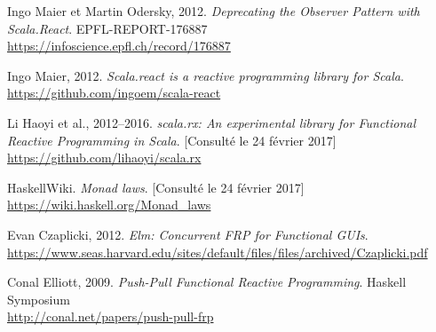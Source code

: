 \begin{thebibliography}{99}

Ingo Maier et Martin Odersky, 2012.
\emph{Deprecating the Observer Pattern with Scala.React}.
EPFL-REPORT-176887\\
\url{https://infoscience.epfl.ch/record/176887}

Ingo Maier, 2012.
\emph{Scala.react is a reactive programming library for Scala}.\\
\url{https://github.com/ingoem/scala-react}

Li Haoyi et al., 2012--2016.
\emph{scala.rx: An experimental library for Functional Reactive Programming in Scala}.
[Consulté le 24 février 2017]\\
\url{https://github.com/lihaoyi/scala.rx}

HaskellWiki.
\emph{Monad laws}.
[Consulté le 24 février 2017]\\
\url{https://wiki.haskell.org/Monad_laws}

Evan Czaplicki, 2012.
\emph{Elm: Concurrent FRP for Functional GUIs}.
\\
\url{https://www.seas.harvard.edu/sites/default/files/files/archived/Czaplicki.pdf}

Conal Elliott, 2009.
\emph{Push-Pull Functional Reactive Programming}.
Haskell Symposium\\
\url{http://conal.net/papers/push-pull-frp}

\end{thebibliography}